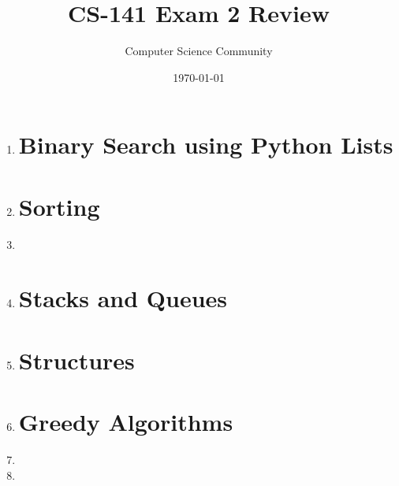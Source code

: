 \documentclass[11pt]{article}
\title{CS-141 Exam 2 Review}
\author{Computer Science Community}
\date{\today}
\begin{document}
\header

\begin{enumerate}

\section*{Linked Lists}
    \item 

\section*{Binary Search using Python Lists}
	\item 

\section*{Sorting}
	\item 
\newpage
	\item 

\newpage
\section*{Stacks and Queues}
	\item 

\newpage

\section*{Structures}
	\item 
	
\newpage
\section*{Greedy Algorithms}
	\item 
	
	\vspace{.25in}
	
	\item 

\end{enumerate}
\end{document}
